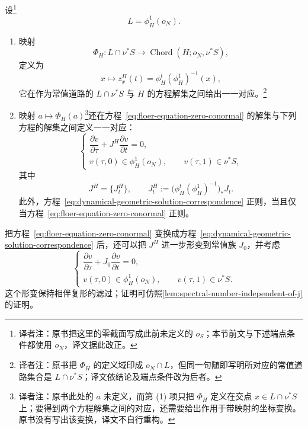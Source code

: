 \begin{lemma}
\label{lem:dynamical-geometric-floer-correspondence}
设\footnote{译者注：原书把这里的零截面写成此前未定义的 $o_S$；本节前文与下述端点条件都使用 $o_N$，译文据此改正。}
\[
  L=\phi_H^1(o_N).
\]
\begin{enumerate}[label=(\arabic*)]
  \item 映射
  \[
    \Phi_H:L\cap\nu^*S
    \longrightarrow\operatorname{Chord}(H;o_N,\nu^*S),
  \]
  定义为
  \[
    x\longmapsto z_x^H(t)
    =\phi_H^t(\phi_H^1)^{-1}(x),
  \]
  它在作为常值道路的 $L\cap\nu^*S$ 与 $H$ 的\personHamilton{}方程解集之间给出一一对应。\footnote{译者注：原书把 $\Phi_H$ 的定义域印成 $o_N\cap L$，但同一句随即写明所对应的常值道路集合是 $L\cap\nu^*S$；译文依结论及端点条件改为后者。}

  \item 映射 $a\longmapsto\Phi_H(a)$\footnote{译者注：原书此处的 $a$ 未定义，而第 (1) 项只把 $\Phi_H$ 定义在交点 $x\in L\cap\nu^*S$ 上；要得到两个方程解集之间的对应，还需要给出作用于带映射的坐标变换。原书没有写出该变换，译文不自行重构。}还在方程~\eqref{eq:floer-equation-zero-conormal} 的解集与下列方程的解集之间定义一一对应：
  \begin{equation}
    \begin{cases}
      \dfrac{\partial v}{\partial\tau}
      +J^H\dfrac{\partial v}{\partial t}=0,\\[6pt]
      v(\tau,0)\in\phi_H^1(o_N),
      \qquad v(\tau,1)\in\nu^*S,
    \end{cases}
  \label{eq:dynamical-geometric-solution-correspondence}
  \end{equation}
  其中
  \[
    J^H=\{J_t^H\},
    \qquad
    J_t^H:=\bigl(\phi_H^t(\phi_H^1)^{-1}\bigr)_*J_t.
  \]
  此外，方程~\eqref{eq:dynamical-geometric-solution-correspondence} 正则，当且仅当方程~\eqref{eq:floer-equation-zero-conormal} 正则。
\end{enumerate}
\end{lemma}

把方程~\eqref{eq:floer-equation-zero-conormal} 变换成方程~\eqref{eq:dynamical-geometric-solution-correspondence} 后，还可以把 $J^H$ 进一步形变到常值族 $J_0$，并考虑
\begin{equation}
  \begin{cases}
    \dfrac{\partial v}{\partial\tau}
    +J_0\dfrac{\partial v}{\partial t}=0,\\[6pt]
    v(\tau,0)\in\phi_H^1(o_N),
    \qquad v(\tau,1)\in\nu^*S.
  \end{cases}
\label{eq:geometric-floer-equation-constant-j}
\end{equation}
这个形变保持相伴\personFloer{}复形的滤过；证明可仿照\cref{lem:spectral-number-independent-of-j}的证明。

